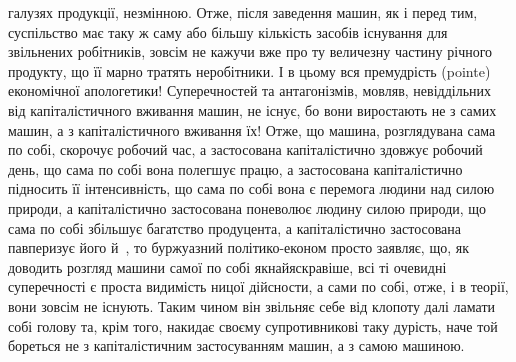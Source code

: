 \parcont{}  %
галузях продукції, незмінною. Отже, після заведення машин,
як і перед тим, суспільство має таку ж саму або більшу кількість
засобів існування для звільнених робітників, зовсім не кажучи
вже про ту величезну частину річного продукту, що її марно
тратять неробітники. І в цьому вся премудрість (pointe) економічної
апологетики! Суперечностей та антагонізмів, мовляв, невіддільних
від капіталістичного вживання машин, не існує, бо
вони виростають не з самих машин, а з капіталістичного вживання
їх! Отже, що машина, розглядувана сама по собі, скорочує
робочий час, а застосована капіталістично здовжує робочий день,
що сама по собі вона полегшує працю, а застосована капіталістично
підносить її інтенсивність, що сама по собі вона є перемога
людини над силою природи, а капіталістично застосована
поневолює людину силою природи, що сама по собі збільшує багатство
продуцента, а капіталістично застосована павперизує
його й~, то буржуазний політико-економ просто заявляє,
що, як доводить розгляд машини самої по собі якнайяскравіше,
всі ті очевидні суперечності є проста видимість ницої дійсности,
а сами по собі, отже, і в теорії, вони зовсім не існують. Таким чином
він звільняє себе від клопоту далі ламати собі голову та,
крім того, накидає своєму супротивникові таку дурість, наче той
бореться не з капіталістичним застосуванням машин, а з самою
машиною.

